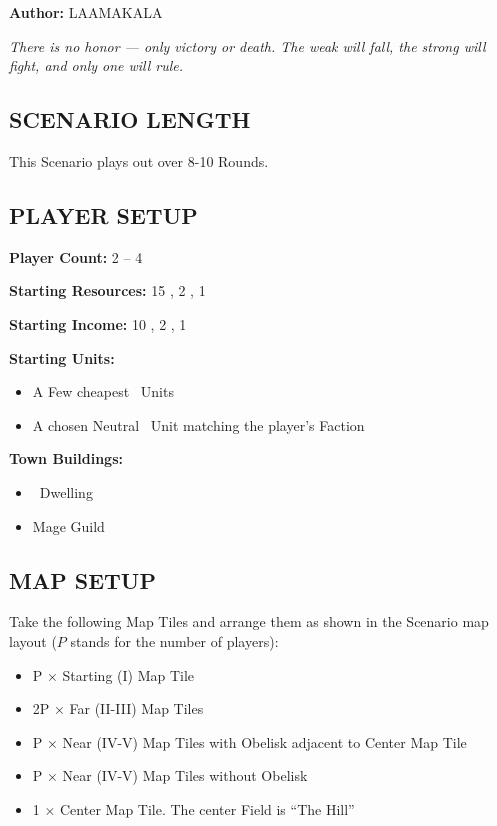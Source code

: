 
\begin{multicols*}{2}

\textbf{Author:} LAAMAKALA

\textit{There is no honor — only victory or death. The weak will fall, the strong will fight, and only one will rule.}

\subsection*{\MakeUppercase{Scenario Length}}
This Scenario plays out over 8-10 Rounds.

\subsection*{\MakeUppercase{Player Setup}}
\textbf{Player Count:} 2 -- 4

\textbf{Starting Resources:} 15 , 2 , 1 

\textbf{Starting Income:} 10 , 2 , 1 

\textbf{Starting Units:}
\begin{itemize}
  \item A Few cheapest \silver\ Units
  \item A chosen Neutral \bronze\ Unit matching the player's Faction
\end{itemize}

\textbf{Town Buildings:}
\begin{itemize}
  \item \bronze\ Dwelling
  \item Mage Guild
\end{itemize}

\subsection*{\MakeUppercase{Map Setup}}
Take the following Map Tiles and arrange them as shown in the Scenario map layout ($P$ stands for the number of players):

\begin{itemize}
  \item P × Starting (I) Map Tile
  \item 2P × Far (II-III) Map Tiles
  \item P × Near (IV-V) Map Tiles with Obelisk adjacent to Center Map Tile
  \item P × Near (IV-V) Map Tiles without Obelisk
  \item 1 × Center Map Tile. The center Field is ``The Hill''
\end{itemize}


\end{multicols*}
